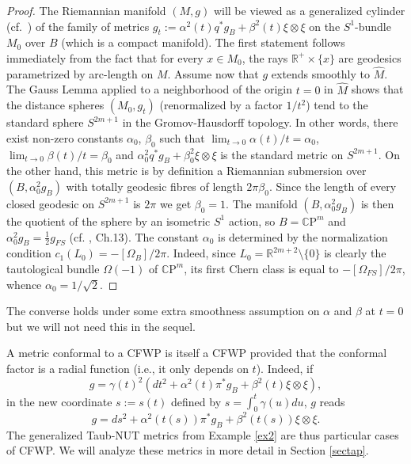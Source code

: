 \documentclass[12pt]{amsart}
\begin{document}
\begin{proof}
The Riemannian manifold $(M,g)$ will be viewed as a generalized
cylinder (cf.\ \cite{bgm05}) of the family of metrics $g_t:={\alpha}
^2(t)q^*g_B+{\beta}^2(t)\xi\otimes\xi$ on the $S^1$-bundle $M_0$ over $B$
(which is a compact manifold). The first statement follows immediately
from the fact that for every $x\in M_0$, the rays ${{\mathbb R}}^+\times \{x\}$
are geodesics parametrized by arc-length on $M$. Assume now that $g$
extends smoothly to $\hat M$. The Gauss Lemma applied to a
neighborhood of the origin $t=0$ in $\hat M$ shows that the distance
spheres $(M_0, g_t)$ (renormalized by a factor $1/t^2$) tend to the
standard sphere $S^{2m+1}$ in the Gromov-Hausdorff topology. In other
words, there exist non-zero constants ${\alpha}_0$, ${\beta}_0$ such that
$\lim_{t\to 0}{\alpha}(t)/t={\alpha}_0$, $\displaystyle\lim_{t\to 0}{\beta}(t)/t={\beta}_0$
and ${\alpha}_0 ^2q^*g_B+{\beta}_0^2\xi\otimes\xi$ is the standard metric on
$S^{2m+1}$. On the other hand, this metric is by definition a
Riemannian submersion over $(B, {\alpha}_0 ^2g_B)$ with totally geodesic
fibres of length $2\pi{\beta}_0$. 
Since the length of every closed geodesic on $S^{2m+1}$ is $2\pi$ we
get ${\beta}_0=1$. The manifold $(B,{\alpha}_0 ^2g_B)$ is then the quotient of
the sphere by an isometric $S^1$ action, so $B={{\mathbb C}} {\mathrm{P}}^m$ and ${\alpha}_0
^2g_B=\tfrac12g_{FS}$ (cf. \cite{m}, Ch.13). The constant ${\alpha}_0$ is
determined by the normalization condition
$c_1(L_0)=-[{\Omega}_B]/2\pi$. Indeed, since $L_0={{\mathbb R}}^{2m+2}\setminus \{0\}$
is clearly the tautological bundle ${\Omega}(-1)$ of ${{\mathbb C}} {\mathrm{P}}^m$, its first
Chern class is equal to $-[{\Omega}_{FS}]/2\pi$, whence ${\alpha}_0=1/\sqrt2$. 
\end{proof}

The converse holds under some extra smoothness assumption on ${\alpha}$ and ${\beta}$ at $t=0$ but we will not need this in the sequel.

\begin{remark}\label{rem4}
A metric conformal to a CFWP is itself a CFWP provided that the conformal 
factor is a radial function (i.e., it only depends on $t$). Indeed, if 
\[g={\gamma}(t)^2(dt^2+{\alpha} ^2(t)\pi^*g_B+{\beta}^2(t)\xi\otimes\xi),\]
in the new coordinate $s:=s(t)$ defined by 
$s=\int_0^t{\gamma}(u)du$, $g$ reads
\[g=ds^2+{\alpha} ^2(t(s))\pi^*g_B+{\beta}^2(t(s))\xi\otimes\xi.\] 
The generalized Taub-NUT metrics from Example \ref{ex2} are thus particular 
cases of CFWP. We will analyze these metrics in more detail in Section
\ref{sectap}.
\end{remark} 
\end{document}
